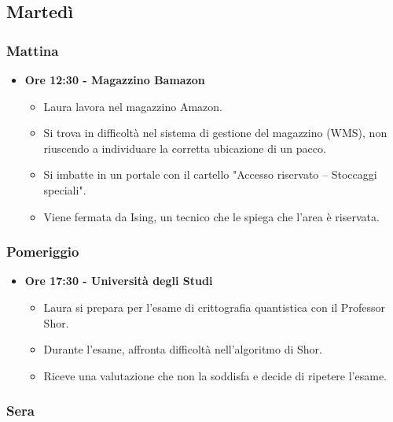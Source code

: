 \subsection*{Martedì}

\subsubsection*{Mattina}

\begin{itemize}
    \item \textbf{Ore 12:30 - Magazzino Bamazon}
    \begin{itemize}
        \item Laura lavora nel magazzino Amazon.
        \item Si trova in difficoltà nel sistema di gestione del magazzino (WMS), non riuscendo a individuare la corretta ubicazione di un pacco.
        \item Si imbatte in un portale con il cartello "Accesso riservato – Stoccaggi speciali".
        \item Viene fermata da Ising, un tecnico che le spiega che l'area è riservata.
    \end{itemize}
\end{itemize}

\subsubsection*{Pomeriggio}

\begin{itemize}
    \item \textbf{Ore 17:30 - Università degli Studi}
    \begin{itemize}
        \item Laura si prepara per l'esame di crittografia quantistica con il Professor Shor.
        \item Durante l'esame, affronta difficoltà nell'algoritmo di Shor.
        \item Riceve una valutazione che non la soddisfa e decide di ripetere l'esame.
    \end{itemize}
\end{itemize}

\subsubsection*{Sera}

